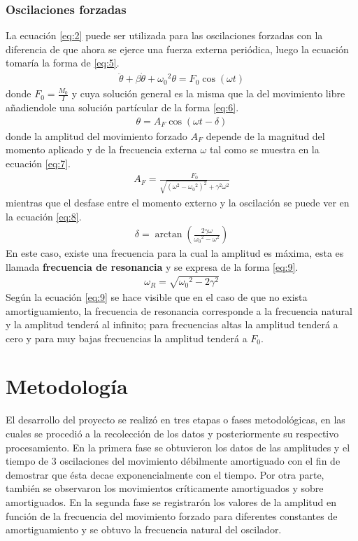 \documentclass[spanish,notitlepage,letterpaper, 12pt]{article}
\begin{document}
\subsubsection{Oscilaciones forzadas}
La ecuación \eqref{eq:2} puede ser utilizada para las oscilaciones forzadas con la diferencia de que ahora se ejerce una fuerza externa periódica, luego la ecuación tomaría la forma de \eqref{eq:5}.
\begin{align}\label{eq:5}
    \ddot{\theta}+\beta\dot{\theta}+{\omega_0}^2\theta=F_0\cos{(\omega t)}
\end{align}
donde $F_0=\frac{M_0}{I}$ y cuya solución general es la misma que la del movimiento libre añadiendole una solución partícular de la forma \eqref{eq:6}.
\begin{align}\label{eq:6}
    \theta=A_F\cos{(\omega t - \delta)}
\end{align}
donde la amplitud del movimiento forzado $A_F$ depende de la magnitud del momento aplicado y de la frecuencia externa $\omega$ tal como se muestra en la ecuación \eqref{eq:7}.
\begin{align}\label{eq:7}
    A_F=\frac{F_0}{\sqrt{(\omega^2-{\omega_0}^2)^2}+\gamma^2\omega^2}
\end{align}
mientras que el desfase entre el momento externo y la oscilación se puede ver en la ecuación \eqref{eq:8}.
\begin{align}\label{eq:8}
    \delta=\arctan{\left(\frac{2\gamma\omega}{{\omega_0}^2-\omega^2}\right)}
\end{align}
En este caso, existe una frecuencia para la cual la amplitud es máxima, esta es llamada \textbf{frecuencia de resonancia} y se expresa de la forma \eqref{eq:9}.
\begin{align}\label{eq:9}
    \omega_R=\sqrt{{\omega_0}^2-2\gamma^2}
\end{align}
Según la ecuación \eqref{eq:9} se hace visible que en el caso de que no exista amortiguamiento, la frecuencia de resonancia corresponde a
la frecuencia natural y la amplitud tenderá al infinito; para frecuencias altas la amplitud
tenderá a cero y para muy bajas frecuencias la amplitud tenderá a $F_0$.
\section{Metodología}
El desarrollo del proyecto se realizó en tres etapas o fases metodológicas, en las
cuales se procedió a la recolección de los datos y posteriormente su respectivo procesamiento.
En la primera fase se obtuvieron los datos de las amplitudes y el tiempo de $3$ oscilaciones
del movimiento débilmente amortiguado con el fin de demostrar que ésta decae
exponencialmente con el tiempo. Por otra parte, también se observaron los movimientos
críticamente amortiguados y sobre amortiguados. En la segunda fase se registrarón los
valores de la amplitud en función de la frecuencia del movimiento forzado para diferentes
constantes de amortiguamiento y se obtuvo la frecuencia natural del oscilador.
\end{document}
